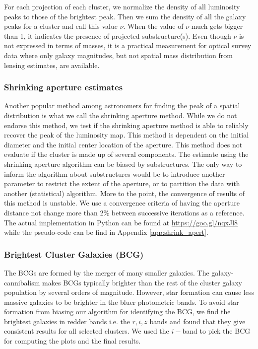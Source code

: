 For each projection of each cluster, we normalize the density of all 
luminosity peaks to those of the brightest peak. 
Then we sum the density of all the galaxy peaks for a cluster and call this value
$\nu$. When the value of $\nu$ much gets bigger than 1, it indicates the presence 
of projected substructure(s). Even though 
$\nu$ is not expressed in terms of masses, it is a practical measurement
for optical survey data where only galaxy magnitudes, but not spatial mass distribution from lensing
estimates, are available. 

\subsubsection{Shrinking aperture estimates}

Another popular method among astronomers for finding the peak of a spatial
distribution is what we call the shrinking aperture method.
While we do not endorse this method,
we test if the shrinking aperture method is able to reliably recover the 
peak of the luminosity map.
This method is dependent on the initial diameter and the initial center 
location of the aperture.
This method does not evaluate if the cluster is made up of
several components.
The estimate using the shrinking aperture algorithm can be biased by
substructures. The only way to inform the algorithm about substructures would
be to introduce another parameter to restrict the extent of the aperture, or to
partition the data with another (statistical) algorithm.
More to the point, the convergence of results of this method is unstable. We use a
convergence criteria of having the aperture distance not change more than 2\% 
between successive iterations as a reference. The actual implementation in
Python can be found at \href{https://goo.gl/nqxJl8}{https://goo.gl/nqxJl8} while
the pseudo-code can be find in Appendix \ref{app:shrink_apert}.

\subsubsection{Brightest Cluster Galaxies (BCG)}
The BCGs are formed by the merger of many smaller
galaxies. The galaxy-cannibalism makes BCGs typically brighter than the rest of 
the cluster galaxy population by several orders of magnitude. 
However, star formation can cause
less massive galaxies to be brighter in the bluer photometric bands.
To avoid star formation from biasing our algorithm for identifying the
BCG, we find the brightest galaxies in redder bands i.e. the $r, i, z$
bands and found that they give consistent results for all selected clusters. 
We used the $i-$band to pick the BCG for computing the plots and the final results. 

